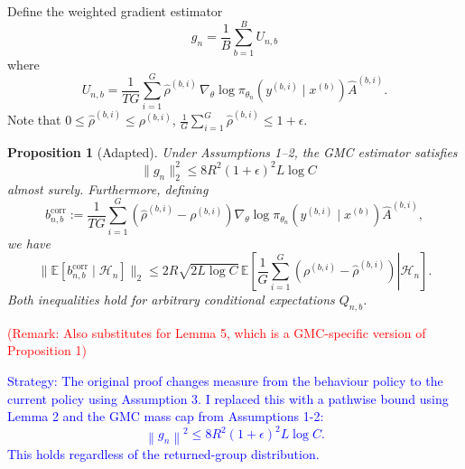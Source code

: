 \documentclass[10pt]{article}
\newcommand{\E}{\mathbb{E}}
\newcommand{\Hh}{\mathcal{H}}
\newcommand{\grad}{\nabla}
\newcommand{\xs}{x^{(b)}}
\newcommand{\ys}{y^{(b,i)}}
\newcommand{\Ab}{\widehat A^{(b,i)}}
\newcommand{\rh}{\widehat\rho^{(b,i)}}
\newcommand{\rb}{\rho^{(b,i)}}
\theoremstyle{preserved}
\newtheorem{proposition}{Proposition}
\begin{document}
Define the weighted gradient estimator
\begin{equation*}
g_n=\frac1B\sum_{b=1}^B U_{n,b}
\end{equation*}
where
\begin{equation*}
U_{n,b}=\frac1{TG}\sum_{i=1}^G\rh\,\grad_\theta\log\pi_{\theta_n}(\ys\mid\xs)\Ab.
\end{equation*}
Note that $0\le\rh\le\rb$, $\frac1G\sum_{i=1}^G\rh\le1+\epsilon$.

\begin{proposition}[Adapted] Under Assumptions 1--2, the GMC estimator satisfies
\begin{equation*} \|g_n\|_2^2 \le8R^2(1+\epsilon)^2L\log C \quad
\end{equation*}
almost surely.
Furthermore, defining
\begin{equation*}
b_{n,b}^{\mathrm{corr}}:=\frac1{TG}\sum_{i=1}^G(\rh-\rb)\grad_\theta\log\pi_{\theta_n}(\ys\mid\xs)\Ab,
\end{equation*}
we have
\begin{equation*}
\|\E[b_{n,b}^{\mathrm{corr}}\mid\Hh_n]\|_2
\le2R\sqrt{2L\log C}\,\E\left[\left.\frac1G\sum_{i=1}^G(\rb-\rh)\right|\Hh_n\right].
\end{equation*}
Both inequalities hold for arbitrary conditional expectations $Q_{n,b}$.
\end{proposition}
\textcolor{red}{(Remark: Also substitutes for Lemma 5, which is a GMC-specific version of Proposition 1)}

\textcolor{blue}{Strategy: The original proof changes measure from the behaviour policy to the current policy using Assumption 3.
I replaced this with a pathwise bound using Lemma 2 and the GMC mass cap from Assumptions 1-2:
$$
\left\|g_n\right\|^2 \leq 8 R^2(1+\epsilon)^2 L \log C .
$$
This holds regardless of the returned-group distribution.}
\end{document}
